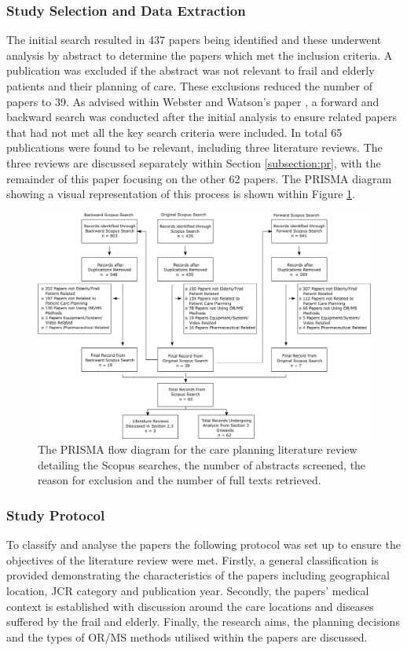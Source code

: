 \documentclass[../thesis.tex]{subfiles}
\begin{document}
\subsubsection{Study Selection and Data Extraction}
The initial search resulted in 437 papers being identified and these underwent analysis by abstract to determine the papers which met the inclusion criteria. A publication was excluded if the abstract was not relevant to frail and elderly patients and their planning of care. These exclusions reduced the number of papers to 39. As advised within Webster and Watson's paper \cite{Webster}, a forward and backward search was conducted after the initial analysis to ensure related papers that had not met all the key search criteria were included.
In total 65 publications were found to be relevant, including three literature reviews. The three reviews are discussed separately within Section \ref{subsection:pr}, with the remainder of this paper focusing on the other 62 papers. The PRISMA diagram showing a visual representation of this process is shown within Figure \ref{appfig:SearchDiag}. 
\begin{landscape}
\begin{figure}
\centering
  \includegraphics[scale=0.65]{Chapter2/Figures/Flowchart.png}
 \caption{The PRISMA flow diagram for the care planning literature review detailing the Scopus searches, the number of abstracts screened, the reason for exclusion and the number of full texts retrieved.}  
\label{appfig:SearchDiag}
\end{figure}
\end{landscape}


\subsubsection{Study Protocol}
To classify and analyse the papers the following protocol was set up to ensure the objectives of the literature review were met. Firstly, a general classification is provided demonstrating the characteristics of the papers including geographical location, JCR category and publication year. Secondly, the papers' medical context is established with discussion around the care locations and diseases suffered by the frail and elderly. Finally, the research aims, the planning decisions and the types of OR/MS methods utilised within the papers are discussed.
\end{document}
